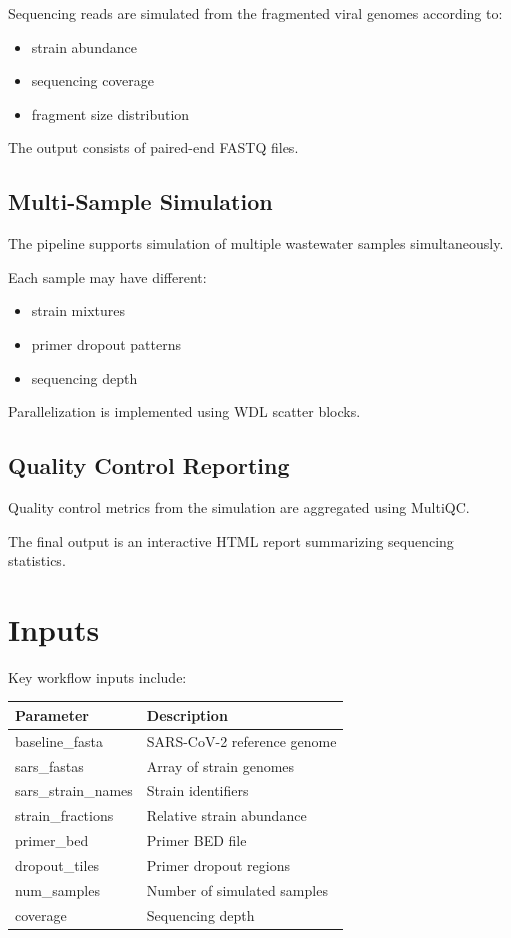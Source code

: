 \documentclass[11pt]{article}
\begin{document}
Sequencing reads are simulated from the fragmented viral genomes according to:

\begin{itemize}
\item strain abundance
\item sequencing coverage
\item fragment size distribution
\end{itemize}

The output consists of paired-end FASTQ files.

\subsection{Multi-Sample Simulation}

The pipeline supports simulation of multiple wastewater samples simultaneously.

Each sample may have different:

\begin{itemize}
\item strain mixtures
\item primer dropout patterns
\item sequencing depth
\end{itemize}

Parallelization is implemented using WDL scatter blocks.

\subsection{Quality Control Reporting}

Quality control metrics from the simulation are aggregated using MultiQC.

The final output is an interactive HTML report summarizing sequencing statistics.

\section{Inputs}

Key workflow inputs include:

\begin{longtable}{|l|l|}
\hline
Parameter & Description \\
\hline
baseline\_fasta & SARS-CoV-2 reference genome \\
sars\_fastas & Array of strain genomes \\
sars\_strain\_names & Strain identifiers \\
strain\_fractions & Relative strain abundance \\
primer\_bed & Primer BED file \\
dropout\_tiles & Primer dropout regions \\
num\_samples & Number of simulated samples \\
coverage & Sequencing depth \\
\hline
\end{longtable}
\end{document}

